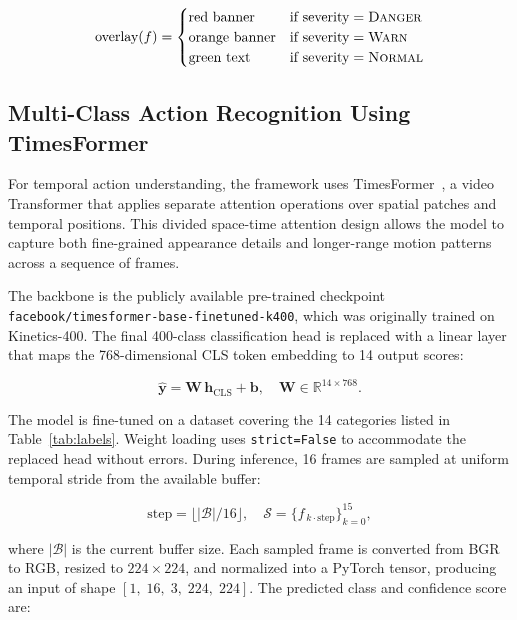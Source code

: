 \documentclass[conference]{IEEEtran}
\begin{document}
\begin{equation}
\text{overlay}(f) =
\begin{cases}
\text{red banner} & \text{if severity} = \textsc{Danger} \\
\text{orange banner} & \text{if severity} = \textsc{Warn} \\
\text{green text} & \text{if severity} = \textsc{Normal}
\end{cases}
\end{equation}

\subsection{Multi-Class Action Recognition Using TimesFormer}

For temporal action understanding, the framework uses
TimesFormer~\cite{bertasius2021}, a video Transformer that applies
separate attention operations over spatial patches and temporal positions.
This divided space-time attention design allows the model to capture both
fine-grained appearance details and longer-range motion patterns across
a sequence of frames.

The backbone is the publicly available pre-trained checkpoint
\texttt{facebook/timesformer-base-finetuned-k400}, which was originally
trained on Kinetics-400. The final 400-class classification head is
replaced with a linear layer that maps the 768-dimensional CLS token
embedding to 14 output scores:

\begin{equation}
\hat{\mathbf{y}} = \mathbf{W}\,\mathbf{h}_\text{CLS} + \mathbf{b},
\quad \mathbf{W} \in \mathbb{R}^{14 \times 768}.
\end{equation}

The model is fine-tuned on a dataset covering the 14 categories listed
in Table~\ref{tab:labels}. Weight loading uses \texttt{strict=False}
to accommodate the replaced head without errors. During inference,
16 frames are sampled at uniform temporal stride from the available buffer:

\begin{equation}
\text{step} = \lfloor |\mathcal{B}| / 16 \rfloor, \quad
\mathcal{S} = \{ f_{\,k \cdot \text{step}} \}_{k=0}^{15},
\end{equation}

where $|\mathcal{B}|$ is the current buffer size. Each sampled frame is
converted from BGR to RGB, resized to $224\times224$, and normalized into
a PyTorch tensor, producing an input of shape $[1,\;16,\;3,\;224,\;224]$.
The predicted class and confidence score are:
\end{document}
